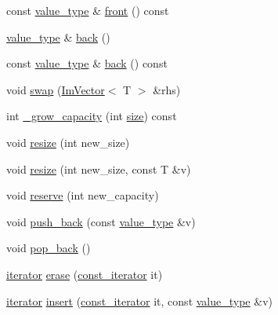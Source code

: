 \begin{DoxyCompactItemize}
\item 
const \mbox{\hyperlink{class_im_vector_a8bd77e4e7581d8e5f9e98d7c2f3c2a80}{value\+\_\+type}} \& \mbox{\hyperlink{class_im_vector_a76dc6bb045574ba79b15a1941b662597}{front}} () const
\item 
\mbox{\hyperlink{class_im_vector_a8bd77e4e7581d8e5f9e98d7c2f3c2a80}{value\+\_\+type}} \& \mbox{\hyperlink{class_im_vector_a3e4424d3fca190894598a6575f9d2401}{back}} ()
\item 
const \mbox{\hyperlink{class_im_vector_a8bd77e4e7581d8e5f9e98d7c2f3c2a80}{value\+\_\+type}} \& \mbox{\hyperlink{class_im_vector_a6f22918d4f139a1c4c3410ccae726f81}{back}} () const
\item 
void \mbox{\hyperlink{class_im_vector_afcec0d2a1e28aebe412b6efd06f0a77a}{swap}} (\mbox{\hyperlink{class_im_vector}{Im\+Vector}}$<$ T $>$ \&rhs)
\item 
int \mbox{\hyperlink{class_im_vector_af9dfc79dfd89c904830bebc492a18310}{\+\_\+grow\+\_\+capacity}} (int \mbox{\hyperlink{class_im_vector_a8c903ecb1aaee0601b6a8ad835a4a435}{size}}) const
\item 
void \mbox{\hyperlink{class_im_vector_ac371dd62e56ae486b1a5038cf07eee56}{resize}} (int new\+\_\+size)
\item 
void \mbox{\hyperlink{class_im_vector_abe7f21776ecfb7d0214963fd8c0689f0}{resize}} (int new\+\_\+size, const T \&v)
\item 
void \mbox{\hyperlink{class_im_vector_a0f14f5736c3372157856eebb67123b75}{reserve}} (int new\+\_\+capacity)
\item 
void \mbox{\hyperlink{class_im_vector_a68387993f2a5f5c3b2a7139d9ab778b8}{push\+\_\+back}} (const \mbox{\hyperlink{class_im_vector_a8bd77e4e7581d8e5f9e98d7c2f3c2a80}{value\+\_\+type}} \&v)
\item 
void \mbox{\hyperlink{class_im_vector_a3db7ce62d3c429effdb893fbf7148c1c}{pop\+\_\+back}} ()
\item 
\mbox{\hyperlink{class_im_vector_a74b5478f1f6fd471cc71219bce483db6}{iterator}} \mbox{\hyperlink{class_im_vector_a1e1fd9b678be9d4b4432fbefde976045}{erase}} (\mbox{\hyperlink{class_im_vector_aedeac9c5080f9d6ce96ae837768ee4c4}{const\+\_\+iterator}} it)
\item 
\mbox{\hyperlink{class_im_vector_a74b5478f1f6fd471cc71219bce483db6}{iterator}} \mbox{\hyperlink{class_im_vector_a52fdb731c13c82a1fd971186c6a701b5}{insert}} (\mbox{\hyperlink{class_im_vector_aedeac9c5080f9d6ce96ae837768ee4c4}{const\+\_\+iterator}} it, const \mbox{\hyperlink{class_im_vector_a8bd77e4e7581d8e5f9e98d7c2f3c2a80}{value\+\_\+type}} \&v)
\end{DoxyCompactItemize}
